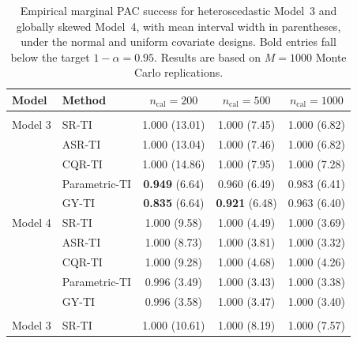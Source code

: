 \begin{table}[!h]
\centering
\caption{\label{tab:marginal-pac-models34}Empirical marginal PAC success for heteroscedastic Model~3 and globally skewed Model~4, with mean interval width in parentheses, under the normal and uniform covariate designs. Bold entries fall below the target \(1-\alpha=0.95\). Results are based on \(M=1000\) Monte Carlo replications.}
\centering
\fontsize{9}{11}\selectfont
\begin{tabular}[t]{llccc}
\toprule
Model & Method & $n_{\mathrm{cal}}=200$ & $n_{\mathrm{cal}}=500$ & $n_{\mathrm{cal}}=1000$\\
\midrule
\addlinespace[0.3em]
\hline
\multicolumn{5}{l}{\textbf{Normal covariate design}}\\
\hspace{1em}Model 3 & SR-TI & 1.000 (13.01) & 1.000 (7.45) & 1.000 (6.82)\\
\hspace{1em} & ASR-TI & 1.000 (13.04) & 1.000 (7.46) & 1.000 (6.82)\\
\hspace{1em} & CQR-TI & 1.000 (14.86) & 1.000 (7.95) & 1.000 (7.28)\\
\hspace{1em} & Parametric-TI & \textbf{0.949} (6.64) & 0.960 (6.49) & 0.983 (6.41)\\
\hspace{1em} & GY-TI & \textbf{0.835} (6.64) & \textbf{0.921} (6.48) & 0.963 (6.40)\\
\hspace{1em}Model 4 & SR-TI & 1.000 (9.58) & 1.000 (4.49) & 1.000 (3.69)\\
\hspace{1em} & ASR-TI & 1.000 (8.73) & 1.000 (3.81) & 1.000 (3.32)\\
\hspace{1em} & CQR-TI & 1.000 (9.28) & 1.000 (4.68) & 1.000 (4.26)\\
\hspace{1em} & Parametric-TI & 0.996 (3.49) & 1.000 (3.43) & 1.000 (3.38)\\
\hspace{1em} & GY-TI & 0.996 (3.58) & 1.000 (3.47) & 1.000 (3.40)\\
\addlinespace[0.3em]
\hline
\multicolumn{5}{l}{\textbf{Uniform covariate design}}\\
\hspace{1em}Model 3 & SR-TI & 1.000 (10.61) & 1.000 (8.19) & 1.000 (7.57)\\

\end{tabular}
\end{table}
